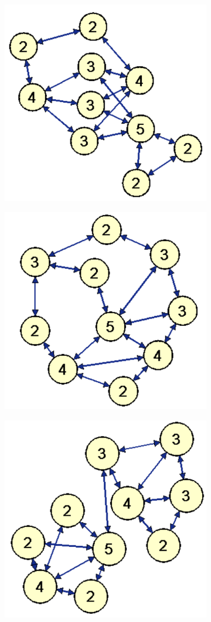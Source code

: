 \documentclass[11pt]{article}
\begin{document}
\begin{figure}[h!]
  \centering
  \begin{subfigure}{.35\textwidth}
    \centering
    \includegraphics[width=.7\linewidth]{lowCluster}
    \caption{}
    \label{fig:lowCluster}
  \end{subfigure}%
  \begin{subfigure}{.35\textwidth}
    \centering
    \includegraphics[width=.7\linewidth]{medCluster}
    \caption{}
    \label{fig:medCluster}
  \end{subfigure}%
  \begin{subfigure}{.35\textwidth}
    \centering
    \includegraphics[width=.7\linewidth]{highCluster}

\end{subfigure}
\end{figure}
\end{document}
